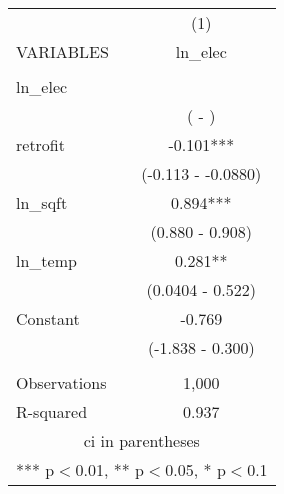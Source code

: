 \documentclass[]{article}
\begin{document}
\begin{tabular}{lc} \hline
 & (1) \\
VARIABLES & ln\_elec \\ \hline
 &  \\
ln\_elec &  \\
 & ( - ) \\
retrofit & -0.101*** \\
 & (-0.113 - -0.0880) \\
ln\_sqft & 0.894*** \\
 & (0.880 - 0.908) \\
ln\_temp & 0.281** \\
 & (0.0404 - 0.522) \\
Constant & -0.769 \\
 & (-1.838 - 0.300) \\
 &  \\
Observations & 1,000 \\
 R-squared & 0.937 \\ \hline
\multicolumn{2}{c}{ ci in parentheses} \\
\multicolumn{2}{c}{ *** p$<$0.01, ** p$<$0.05, * p$<$0.1} \\
\end{tabular}
\end{document}
